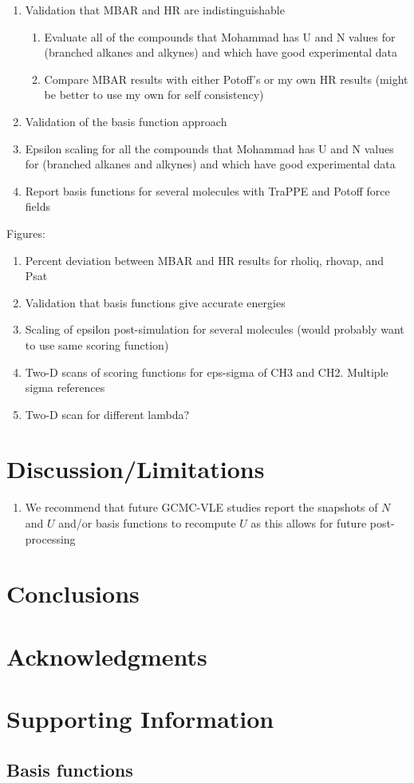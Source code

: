 \documentclass[11pt,a4paper]{article}
\begin{document}
\begin{enumerate}
	\item Validation that MBAR and HR are indistinguishable
	\begin{enumerate}
		\item Evaluate all of the compounds that Mohammad has U and N values for (branched alkanes and alkynes) and which have good experimental data
		\item Compare MBAR results with either Potoff's or my own HR results (might be better to use my own for self consistency)
	\end{enumerate}
    \item Validation of the basis function approach
    \item Epsilon scaling for all the compounds that Mohammad has U and N values for (branched alkanes and alkynes) and which have good experimental data
    \item Report basis functions for several molecules with TraPPE and Potoff force fields
\end{enumerate}

Figures:

\begin{enumerate}
	\item Percent deviation between MBAR and HR results for rholiq, rhovap, and Psat
	\item Validation that basis functions give accurate energies
	\item Scaling of epsilon post-simulation for several molecules (would probably want to use same scoring function)
	\item Two-D scans of scoring functions for eps-sigma of CH3 and CH2. Multiple sigma references
	\item Two-D scan for different lambda?
\end{enumerate}

\section{Discussion/Limitations}

\begin{enumerate}
	\item We recommend that future GCMC-VLE studies report the snapshots of $N$ and $U$ and/or basis functions to recompute $U$ as this allows for future post-processing
\end{enumerate}

\section{Conclusions}

\section{Acknowledgments}

\section{Supporting Information}

\subsection{Basis functions}
\end{document}
